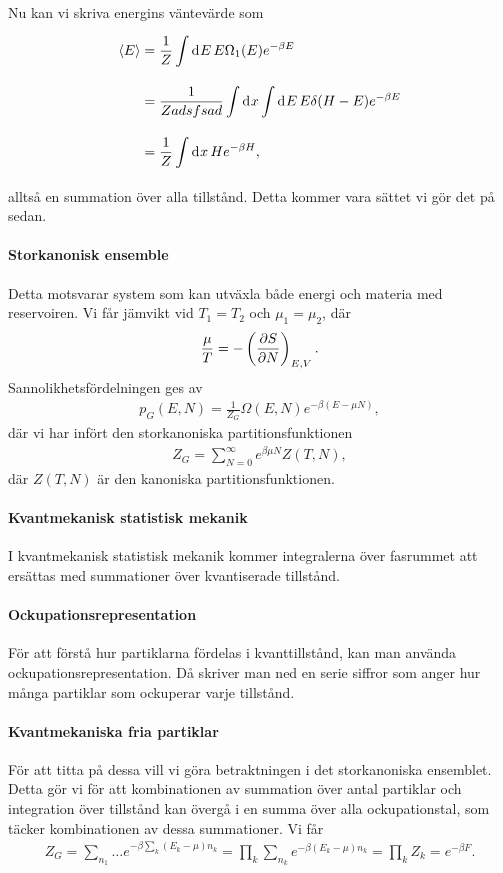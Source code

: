 Nu kan vi skriva energins väntevärde som
\begin{align*}
	\expval{E} &= \frac{1}{Z}\int\limits_{}^{}\dd[]{E}E\Omega_{1}(E)e^{-\beta E} \\
	           &= \frac{1}{Zadsfsad}\int\limits_{}^{}\dd[]{x}\int\limits_{}^{}\dd[]{E}E\delta(H - E)e^{-\beta E} \\
	           &= \frac{1}{Z}\int\limits_{}^{}\dd[]{x}He^{-\beta H},
\end{align*}
alltså en summation över alla tillstånd. Detta kommer vara sättet vi gör det på sedan.

\paragraph{Storkanonisk ensemble}
Detta motsvarar system som kan utväxla både energi och materia med reservoiren. Vi får jämvikt vid $T_{1} = T_{2}$ och $\mu_{1} = \mu_{2}$, där
\begin{align*}
	\frac{\mu}{T} = -\left(\pdv{S}{N}\right)_{E, V}.
\end{align*}
Sannolikhetsfördelningen ges av
\begin{align*}
	p_{G}(E, N) = \frac{1}{Z_{G}}\Omega(E, N)e^{-\beta(E - \mu N)},
\end{align*}
där vi har infört den storkanoniska partitionsfunktionen
\begin{align*}
	Z_{G} = \sum\limits_{N = 0}^{\infty}e^{\beta\mu N}Z(T, N),
\end{align*}
där $Z(T, N)$ är den kanoniska partitionsfunktionen.

\paragraph{Kvantmekanisk statistisk mekanik}
I kvantmekanisk statistisk mekanik kommer integralerna över fasrummet att ersättas med summationer över kvantiserade tillstånd.

\paragraph{Ockupationsrepresentation}
För att förstå hur partiklarna fördelas i kvanttillstånd, kan man använda ockupationsrepresentation. Då skriver man ned en serie siffror som anger hur många partiklar som ockuperar varje tillstånd.

\paragraph{Kvantmekaniska fria partiklar}
För att titta på dessa vill vi göra betraktningen i det storkanoniska ensemblet. Detta gör vi för att kombinationen av summation över antal partiklar och integration över tillstånd kan övergå i en summa över alla ockupationstal, som täcker kombinationen av dessa summationer. Vi får
\begin{align*}
	Z_{G} = \sum\limits_{n_1}\dots e^{-\beta\sum\limits_{k}(E_{k} - \mu)n_{k}} = \prod\limits_{k}\sum\limits_{n_{k}}e^{-\beta(E_{k} - \mu)n_{k}} = \prod\limits_{k}Z_{k} = e^{-\beta F}.
\end{align*}